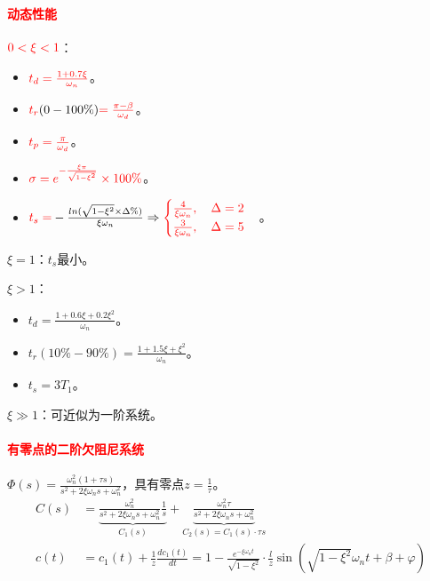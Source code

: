 \documentclass[
12pt, %
a4paper, 
oneside, %
]{scrartcl}
\begin{document}
\paragraph{\textcolor{red}{动态性能}}
\begin{itemize}
\begin{minipage}[t]{0.6\textwidth}
\item $ \textcolor{red}{0 < \xi < 1} $：
\begin{itemize}
\item $ \textcolor{red}{t_d = \frac{1 + 0.7\xi}{\omega_n}} $。
\item $ \textcolor{red}{t_r}(0 - 100\%) \textcolor{red}{= \frac{\pi - \beta}{\omega_d}} $。
\item $ \textcolor{red}{t_p = \frac{\pi}{\omega_d}} $。
\item $ \textcolor{red}{\sigma = e^{-\frac{\xi \pi}{\sqrt{1 - \xi^2}}} \times 100\%} $。
\item $ \textcolor{red}{t_s =} -\frac{ln(\sqrt{1 - \xi^2} \times \Delta\%)}{\xi \omega_n} \Rightarrow \textcolor{red}{\begin{cases} \frac{4}{\xi \omega_n}, \quad \Delta = 2 \\ \frac{3}{\xi \omega_n}, \quad \Delta = 5 \end{cases}} $。
\end{itemize}
\end{minipage}
\begin{minipage}[t]{0.4\textwidth}
\item $ \xi = 1 $：$ t_s $最小。
\item $ \xi > 1 $：
\begin{itemize}
\item $ t_d = \frac{1 + 0.6\xi + 0.2\xi^2}{\omega_n} $。
\item $ t_r(10\% - 90\%) = \frac{1 + 1.5\xi + \xi^2}{\omega_n} $。
\item $ t_s = 3T_1 $。
\end{itemize}
\item $ \xi \gg 1 $：可近似为一阶系统。
\end{minipage}
\end{itemize}
\paragraph{\textcolor{red}{有零点的二阶欠阻尼系统}}
$ \Phi(s) = \frac{\omega_n^2(1 + \tau s)}{s^2 + 2\xi \omega_n s + \omega_n^2} $，具有零点$ z = \frac{1}{\tau} $。
\begin{align*}
C(s) &= \underbrace{\frac{\omega_n^2}{s^2 + 2\xi \omega_n s + \omega_n^2} \frac{1}{s}}_{C_1(s)} + \underbrace{\frac{\omega_n^2 \tau}{s^2 + 2\xi \omega_n s + \omega_n^2}}_{C_2(s) = C_1(s) \cdot \tau s} \\
c(t) &= c_1(t) + \frac{1}{z} \frac{d c_1(t)}{dt} = 1 - \frac{e^{-\xi \omega_n t}}{\sqrt{1 - \xi^2}} \cdot \frac{l}{z} \sin(\sqrt{1 - \xi^2}\omega_n t + \beta + \varphi)
\end{align*}
\end{document}
